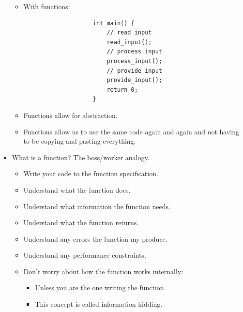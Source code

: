 \begin{itemize}
\begin{itemize}
            \item With functions:
                \begin{verbatim}
                    int main() {
                        // read input
                        read_input();
                        // process input
                        process_input();
                        // provide input
                        provide_input();
                        return 0;
                    }
                \end{verbatim}
        \end{itemize}
        \begin{itemize}
            \item Functions allow for abstraction.
            \item Functions allow us to use the same code again and again and not having to be copying and pasting everything.
        \end{itemize}
    
    \item What is a function? The boss/worker analogy.
        \begin{itemize}
            \item Write your code to the function specification.
            \item Understand what the function does.
            \item Understand what information the function needs.
            \item Understand what the function returns.
            \item Understand any errors the function my produce.
            \item Understand any performance constraints.
            \item Don't worry about how the function works internally:
                \begin{itemize}
                    \item Unless you are the one writing the function.
                    \item This concept is called information hidding.
                \end{itemize}
        \end{itemize}
    

\end{itemize}
